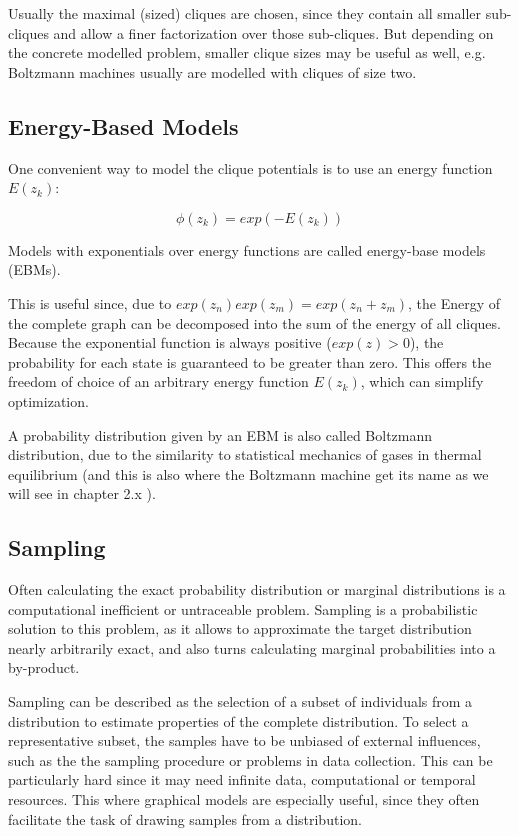 Usually the maximal (sized) cliques are chosen, since they contain all smaller sub-cliques and allow a finer factorization over those sub-cliques.
But depending on the concrete modelled problem, smaller clique sizes may be useful as well, e.g. Boltzmann machines usually are modelled with cliques of size two.




\subsection{Energy-Based Models}

One convenient way to model the clique potentials is to use an energy function $E(z_k)$: 

\[
\phi(z_k) = exp(- E(z_k))
\]

Models with exponentials over energy functions are called energy-base models (EBMs).

This is useful since, due to $exp(z_n)exp(z_m) = exp(z_n+z_m)$, the Energy of the complete graph can be decomposed into the sum of the energy of all cliques.
Because the exponential function is always positive ($exp(z) > 0$), the probability for each state is guaranteed to be greater than zero. 
This offers the freedom of choice of an arbitrary energy function $E(z_k)$, which can simplify optimization. 

A probability distribution given by an EBM is also called Boltzmann distribution, due to the similarity to statistical mechanics of gases in thermal equilibrium (and this is also where the Boltzmann machine get its name as we will see in chapter 2.x ).

\subsection{Sampling}

Often calculating the exact probability distribution or marginal distributions is a computational inefficient or untraceable problem.
Sampling is a probabilistic solution to this problem, as it allows to approximate the target distribution nearly arbitrarily exact, and also turns calculating marginal probabilities into a by-product.  

Sampling can be described as the selection of a subset of individuals from a distribution to estimate properties of the complete distribution.
To select a representative subset, the samples have to be unbiased of external influences, such as the the sampling procedure or problems in data collection.
This can be particularly hard since it may need infinite data, computational or temporal resources.
This where graphical models are especially useful, since they often facilitate the task of drawing samples from a distribution.


